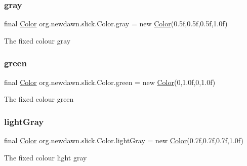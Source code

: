 \subsubsection{\texorpdfstring{gray}{gray}}
{\footnotesize\ttfamily final \mbox{\hyperlink{classorg_1_1newdawn_1_1slick_1_1_color}{Color}} org.\+newdawn.\+slick.\+Color.\+gray = new \mbox{\hyperlink{classorg_1_1newdawn_1_1slick_1_1_color}{Color}}(0.\+5f,0.\+5f,0.\+5f,1.\+0f)\hspace{0.3cm}{\ttfamily [static]}}

The fixed colour gray \mbox{\label{classorg_1_1newdawn_1_1slick_1_1_color_a1cd4406bbd518aeb8baefcf19df24424}} 
\subsubsection{\texorpdfstring{green}{green}}
{\footnotesize\ttfamily final \mbox{\hyperlink{classorg_1_1newdawn_1_1slick_1_1_color}{Color}} org.\+newdawn.\+slick.\+Color.\+green = new \mbox{\hyperlink{classorg_1_1newdawn_1_1slick_1_1_color}{Color}}(0,1.\+0f,0,1.\+0f)\hspace{0.3cm}{\ttfamily [static]}}

The fixed colour green \mbox{\label{classorg_1_1newdawn_1_1slick_1_1_color_ab7a90077a21b608c4e4e7080e4a692bc}} 
\subsubsection{\texorpdfstring{light\+Gray}{lightGray}}
{\footnotesize\ttfamily final \mbox{\hyperlink{classorg_1_1newdawn_1_1slick_1_1_color}{Color}} org.\+newdawn.\+slick.\+Color.\+light\+Gray = new \mbox{\hyperlink{classorg_1_1newdawn_1_1slick_1_1_color}{Color}}(0.\+7f,0.\+7f,0.\+7f,1.\+0f)\hspace{0.3cm}{\ttfamily [static]}}

The fixed colour light gray \mbox{\label{classorg_1_1newdawn_1_1slick_1_1_color_ab806bfc25e9cab954c1056a692ef6925}} 
